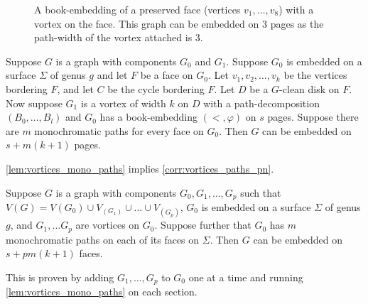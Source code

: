\begin{figure}[h!]
	\centering
	
	\caption[Book-embedding of a preserved face]{A book-embedding of a preserved face (vertices $v_1, \ldots , v_8$) with a vortex on the face. This graph can be embedded on $3$ pages as the path-width of the vortex attached is 3. }\label{fig:preserved_face}
\end{figure}

\begin{lemma}\label{lem:vortices_mono_paths}
	Suppose \(G\) is a graph with components \(G_0\) and \(G_1\). Suppose \(G_0\) is embedded on a surface \(\Sigma \) of genus \(g\) and let \(F\) be a face on \(G_0\). Let \(v_1, v_2, \ldots, v_k\) be the vertices bordering \(F\), and let \(C\) be the cycle bordering \(F\). Let \(D\) be a \(G\)-clean disk on \(F\). Now suppose \(G_1\) is a vortex of width $k$ on \(D\) with a path-decomposition \((B_0, \ldots, B_l)\) and \(G_0\) has a book-embedding \((<, \varphi)\) on $s$ pages. Suppose there are \(m\) monochromatic paths for every face on $G_0$. Then \(G\) can be embedded on \(s + m(k+1)\) pages.
\end{lemma}

\cref{lem:vortices_mono_paths} implies \cref{corr:vortices_paths_pn}.

\begin{corollary}\label{corr:vortices_paths_pn}
	Suppose $G$ is a graph with components $G_0, G_1, \ldots, G_p$ such that $V(G) = V(G_0) \cup V_(G_1) \cup \ldots \cup V_(G_p)$, $G_0$ is embedded on a surface $\Sigma$ of genus $g$, and $G_1, \ldots G_p$ are vortices on $G_0$. Suppose further that $G_0$ has $m$ monochromatic paths on each of its faces on $\Sigma$. Then $G$ can be embedded on $s + pm(k+1)$ faces.
\end{corollary}

This is proven by adding $G_1, \ldots, G_p$ to $G_0$ one at a time and running \cref{lem:vortices_mono_paths} on each section. 

